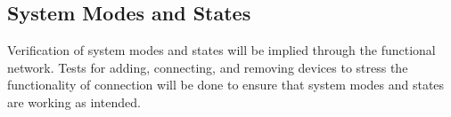 \documentclass[tikz,a4paper,titlepage]{article}
\begin{document}








\subsection{System Modes and States} %

Verification of system modes and states will be implied through the functional network. Tests for adding, connecting, and removing devices to stress the functionality of connection will be done to ensure that system modes and states are working as intended.
\end{document}
